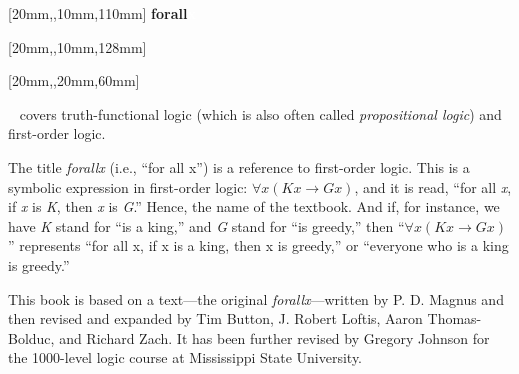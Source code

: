 \documentclass[bleedwidth=3.17mm, marklength=0mm, coverheight=228.6mm, coverwidth=152.4mm, spinewidth=13.82mm]{bookcover} %
\begin{document}
\begin{bookcover}
\pagecolor{forallx-orange}

[20mm,,10mm,110mm]{\sffamily   %
\fontsize{44}{44}\selectfont\hfill \textbf{forall\textcolor{white}{x}}} 		%

[20mm,,10mm,128mm]{\sffamily
\fontsize{20}{20}\selectfont\hfill \textbf{\textls{\textcolor{white}{THE MISSISSIPPI STATE EDITION}}}}  







[20mm,,20mm,60mm]{\sffamily    %
\textcolor{white}{}~ covers truth-functional logic (which is also often called \textit{propositional logic}) and first-order logic. 

\quad The title \textit{forallx} (i.e., ``for all x'') is a reference to first-order logic. This is a symbolic expression in first-order logic: $\forall x(Kx \rightarrow Gx)$, and it is read, ``for all \textit{x}, if \textit{x} is \textit{K}, then \textit{x} is \textit{G}.'' Hence, the name of the textbook. And if, for instance, we have \textit{K} stand for ``is a king,'' and \textit{G} stand for ``is greedy,'' then ``$\forall x(Kx \rightarrow Gx)$'' represents ``for all x, if x is a king, then x is greedy,'' or ``everyone who is a king is greedy.''

\quad This book is based on a text---the original \textit{forallx}---written by P. D. Magnus and then revised and expanded by Tim Button, J. Robert Loftis, Aaron Thomas-Bolduc, and Richard Zach. It has been further revised by Gregory Johnson for the 1000-level logic course at Mississippi State University.

}
\end{bookcover}
\end{document}

